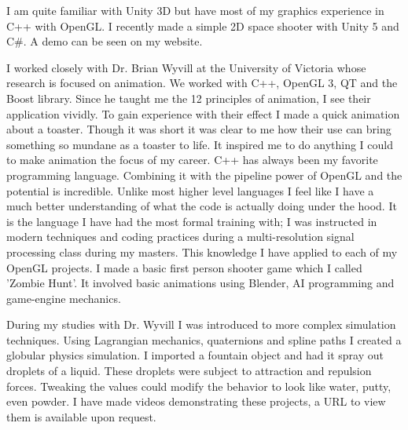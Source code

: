 I am quite familiar with Unity 3D but have most of my graphics experience in C++ with OpenGL.
I recently made a simple 2D space shooter with Unity 5 and C\#.
A demo can be seen on my website.

I worked closely with Dr. Brian Wyvill at the University of Victoria whose research is focused on animation.
We worked with C++, OpenGL 3, QT and the Boost library.
Since he taught me the 12 principles of animation, I see their application vividly. 
To gain experience with their effect I made a quick animation about a toaster.
Though it was short it was clear to me how their use can bring something so mundane as a toaster to life.
It inspired me to do anything I could to make animation the focus of my career.
C++ has always been my favorite programming language.
Combining it with the pipeline power of OpenGL and the potential is incredible.
Unlike most higher level languages I feel like I have a much better understanding of what the code is actually doing under the hood.
It is the language I have had the most formal training with; I was instructed in modern techniques and coding practices during a multi-resolution signal processing class during my masters.
This knowledge I have applied to each of my OpenGL projects.
I made a basic first person shooter game which I called 'Zombie Hunt'.
It involved basic animations using Blender, AI programming and game-engine mechanics. 

During my studies with Dr. Wyvill I was introduced to more complex simulation techniques.
Using Lagrangian mechanics, quaternions and spline paths I created a globular physics simulation. 
I imported a fountain object and had it spray out droplets of a liquid.
These droplets were subject to attraction and repulsion forces.
Tweaking the values could modify the behavior to look like water, putty, even powder.
I have made videos demonstrating these projects, a URL to view them is available upon request.